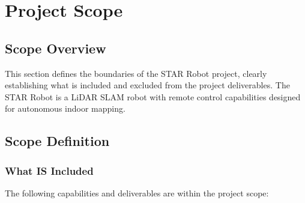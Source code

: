 
\section{Project Scope}
\label{sec:scope}

\subsection{Scope Overview}

This section defines the boundaries of the STAR Robot project, clearly establishing what is included and excluded from the project deliverables. The STAR Robot is a LiDAR SLAM robot with remote control capabilities designed for autonomous indoor mapping.

\subsection{Scope Definition}

\subsubsection{What IS Included}

The following capabilities and deliverables are within the project scope:

